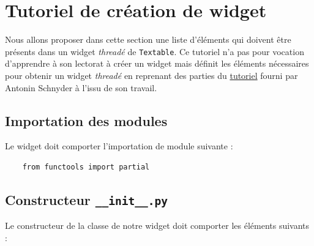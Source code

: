 \documentclass{article}
\begin{document}
\section{Tutoriel de création de widget}

Nous allons proposer dans cette section une liste d'éléments qui doivent être présents dans un widget \textit{threadé} de \texttt{Textable}. Ce tutoriel n'a pas pour vocation d'apprendre à son lectorat à créer un widget mais définit les éléments nécessaires pour obtenir un widget \textit{threadé} en reprenant des parties du \href{https://docs.google.com/document/d/1QtXm2aYMZXAyM7mfBTqxt_XrTNFqC7e3aqy7OC1A_18/edit#heading=h.xyhgv3cij1d7}{tutoriel} fourni par Antonin Schnyder à l'issu de son travail.

\subsection{Importation des modules}

Le widget doit comporter l'importation de module suivante : 

\begin{verbatim}
    from functools import partial
\end{verbatim}

\subsection{Constructeur \texttt{\_\_init\_\_.py}}

Le constructeur de la classe de notre widget doit comporter les éléments suivants : 
\end{document}
